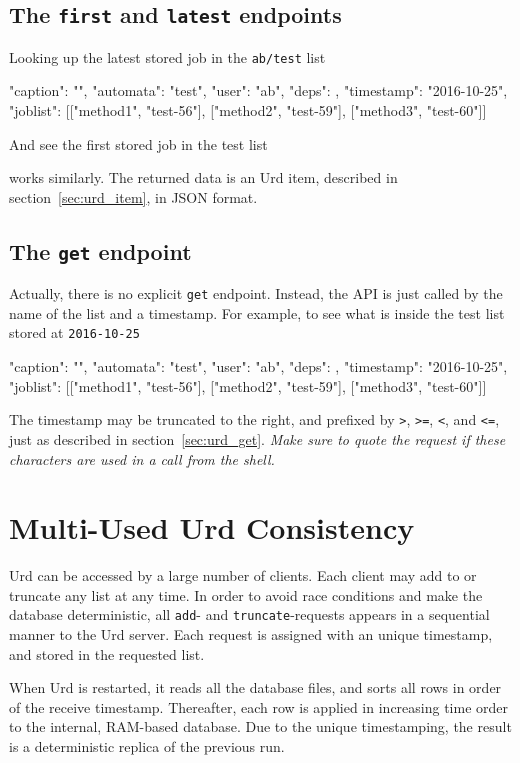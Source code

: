 \subsection{The \texttt{first} and \texttt{latest} endpoints}
Looking up the latest stored job in the \texttt{ab/test} list
\begin{shell}
{"caption": "", "automata": "test", "user": "ab", "deps": {},
  "timestamp": "2016-10-25", "joblist": [["method1", "test-56"],
  ["method2", "test-59"], ["method3", "test-60"]]}
\end{shell}
And see the first stored job in the test list
\begin{shell}
\end{shell}
works similarly.  The returned data is an Urd item, described in
section~\ref{sec:urd_item}, in JSON format.



\subsection{The \texttt{get} endpoint}
Actually, there is no explicit \texttt{get} endpoint.  Instead, the
API is just called by the name of the list and a timestamp.  For
example, to see what is inside the test list stored
at \texttt{2016-10-25}
\begin{shell}
{"caption": "", "automata": "test", "user": "ab", "deps": {},
  "timestamp": "2016-10-25", "joblist": [["method1", "test-56"],
  ["method2", "test-59"], ["method3", "test-60"]]}
\end{shell}
The timestamp may be truncated to the right, and prefixed
by \texttt{>}, \texttt{>=}, \texttt{<}, and \texttt{<=}, just as
described in section~\ref{sec:urd_get}.  \textsl{Make sure to quote
the request if these characters are used in a call from the shell.}





\section{Multi-Used Urd Consistency}
Urd can be accessed by a large number of clients.  Each client may add
to or truncate any list at any time.  In order to avoid race
conditions and make the database deterministic, all \texttt{add}-
and \texttt{truncate}-requests appears in a sequential manner to the
Urd server.  Each request is assigned with an unique timestamp, and
stored in the requested list.

When Urd is restarted, it reads all the database files, and sorts all
rows in order of the receive timestamp.  Thereafter, each row is
applied in increasing time order to the internal, RAM-based database.
Due to the unique timestamping, the result is a deterministic replica
of the previous run.
